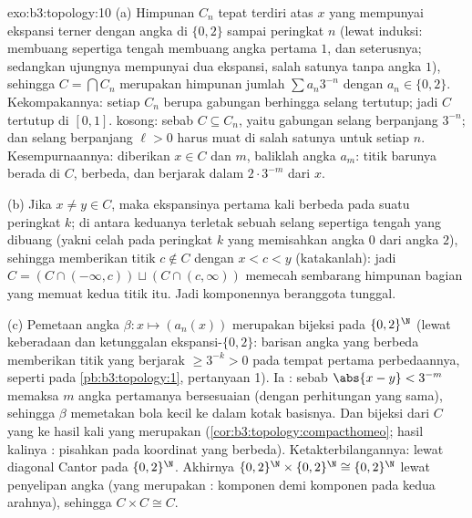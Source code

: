 \begin{solution}{exo:b3:topology:10}
(a) Himpunan $C_n$ tepat terdiri atas $x$ yang mempunyai ekspansi
terner dengan angka di $\{0, 2\}$ sampai peringkat $n$ (lewat induksi:
membuang sepertiga tengah membuang angka pertama $1$, dan seterusnya; sedangkan ujungnya
mempunyai dua ekspansi, salah satunya tanpa angka $1$), sehingga $C = \bigcap C_n$
merupakan himpunan jumlah $\sum a_n3^{-n}$ dengan $a_n \in \{0,2\}$. Kekompakannya:
setiap $C_n$ berupa gabungan berhingga selang tertutup; jadi $C$ tertutup
di $[0,1]$.  kosong: sebab $C \subseteq C_n$, yaitu gabungan
selang berpanjang $3^{-n}$; dan selang  berpanjang
$\ell > 0$ harus muat di salah satunya untuk setiap $n$. Kesempurnaannya: diberikan
$x \in C$ dan $m$, baliklah angka $a_m$: titik barunya berada di
$C$, berbeda, dan berjarak dalam $2\cdot3^{-m}$ dari $x$.

(b) Jika $x \neq y \in C$, maka ekspansinya pertama kali berbeda pada suatu
peringkat $k$; di antara keduanya terletak sebuah selang sepertiga tengah yang dibuang
(yakni celah pada peringkat $k$ yang memisahkan angka $0$ dari angka $2$),
sehingga memberikan titik $c \notin C$ dengan $x < c < y$ (katakanlah): jadi $C =
(C \cap (-\infty, c)) \sqcup (C \cap (c, \infty))$ memecah sembarang
himpunan bagian yang memuat kedua titik itu. Jadi komponennya beranggota tunggal.

(c) Pemetaan angka $\beta\colon x \mapsto (a_n(x))$ merupakan
bijeksi pada $\{0,2\}^\N$ (lewat keberadaan dan ketunggalan
ekspansi-$\{0,2\}$: barisan angka yang berbeda memberikan titik yang
berjarak $\geq 3^{-k} > 0$ pada tempat pertama perbedaannya, seperti pada
\cref{pb:b3:topology:1}, pertanyaan 1). Ia : sebab
$\abs{x - y} < 3^{-m}$ memaksa $m$ angka pertamanya bersesuaian
(dengan perhitungan yang sama), sehingga $\beta$ memetakan bola kecil ke dalam kotak
basisnya. Dan bijeksi  dari $C$ yang  ke hasil kali yang
 merupakan 
(\cref{cor:b3:topology:compacthomeo}; hasil kalinya :
pisahkan pada koordinat yang berbeda). Ketakterbilangannya: lewat diagonal
Cantor pada $\{0,2\}^\N$. Akhirnya $\{0,2\}^\N \times
\{0,2\}^\N \cong \{0,2\}^\N$ lewat penyelipan angka (yang merupakan
:  komponen demi komponen pada kedua arahnya), sehingga $C
\times C \cong C$.
\end{solution}

